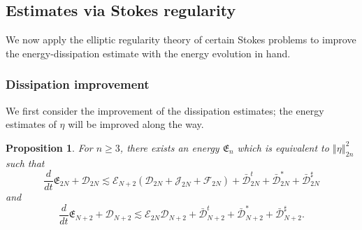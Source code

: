 \documentclass[a4paper,reqno,11pt]{amsart}
\numberwithin{equation}{section}
\providecommand{\norm}[1]{\left\Vert#1\right\Vert}
\providecommand{\sd}[1]{\mathcal{D}_{#1}}
\providecommand{\se}[1]{\mathcal{E}_{#1}}
\providecommand{\norm}[1]{\left\Vert#1\right\Vert}
\newtheorem{prop}[lem]{Proposition}
\begin{document}
\subsection{Estimates via Stokes regularity}

We now apply the elliptic regularity theory of certain Stokes problems to improve the energy-dissipation estimate with the energy evolution in hand.

\subsubsection{Dissipation improvement}

We first consider the improvement of the dissipation estimates; the energy estimates of $\eta$ will be improved along the way.
\begin{prop}\label{p_upper_evolution  N'}
For $n\ge 3$, there exists an energy $\mathfrak{E}_n $ which is equivalent to $\norm{\eta}_{2n}^2$ such that
\begin{equation}\label{d2n}
\frac{d}{dt}\mathfrak{E}_{2N}+\mathcal{D}_{2N}{\lesssim}  { \se{N+2}  }(\sd{2N} +  \mathcal{J}_{2N} +{\mathcal{F}_{2N}})+\bar{\mathcal{D}}_{2N}^t+\bar{\mathcal{D}}_{2N}^\ast+\bar{\mathcal{D}}_{2N}^\sharp
\end{equation}
and
\begin{equation}\label{d2n+2}
\frac{d}{dt}\mathfrak{E}_{N+2} +\mathcal{D}_{N+2}{\lesssim} { \se{2N}   } \sd{N+2}+\bar{\mathcal{D}}_{N+2}^t+\bar{\mathcal{D}}_{N+2}^\ast+\bar{\mathcal{D}}_{N+2}^\sharp.
\end{equation}
\end{prop}
\end{document}
